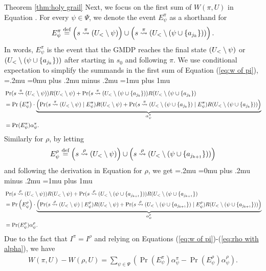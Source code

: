 \begin{proofof}{Theorem \ref{thm:holy grail}}
Next, we focus on the first sum of $W(\pi,U)$ in Equation . For every $\psi\in \Psi$, we denote the event $E^\pi_\psi$ as a shorthand for
\[
E^\pi_\psi \stackrel{\text{def}}{=} \left(s\stackrel{\pi}{\rightsquigarrow}(U_<\setminus \psi)\right)\cup\left( s\stackrel{\pi}{\rightsquigarrow}(U_<\setminus (\psi \cup \{a_{j_k}\}))\right).
\]
In words, $E^\pi_\psi$ is the event that the GMDP reaches the final state $(U_<\setminus \psi)$ or $(U_<\setminus (\psi \cup \{a_{j_k}\}))$ after starting in $s_0$ and following $\pi$. We use conditional expectation to simplify the summands in the first sum of Equation (\ref{eq:w of pi}),
{\thinmuskip=.2mu
\medmuskip=0mu plus .2mu minus .2mu
\thickmuskip=1mu plus 1mu
\begin{align}\label{eq:pi with alpha}
&\Pr(s\stackrel{\pi}{\rightsquigarrow}(U_<\setminus \psi))R(U_<\setminus \psi)+\Pr(s\stackrel{\pi}{\rightsquigarrow}(U_<\setminus (\psi \cup \{a_{j_k}\}))R(U_<\setminus (\psi \cup \{a_{j_k}\})\nonumber\\
&=\Pr\left(E^\pi_\psi\right)\cdot \underbrace{\left( \Pr(s\stackrel{\pi}{\rightsquigarrow}(U_<\setminus \psi)\mid E^\pi_\psi)R(U_<\setminus \psi)+\Pr(s\stackrel{\pi}{\rightsquigarrow}(U_<\setminus (\psi \cup \{a_{j_k}\})\mid E^\pi_\psi)R(U_<\setminus (\psi \cup \{a_{j_k}\}))\right)}_{\alpha^\pi_\psi}\nonumber\\
&=\Pr(E^\pi_\psi) \alpha^\pi_\psi. 
\end{align}}%
Similarly for $\rho$, by letting
\[
E^\rho_\psi \stackrel{\text{def}}{=} \left(s\stackrel{\rho}{\rightsquigarrow}(U_<\setminus \psi)\right)\cup\left( s\stackrel{\rho}{\rightsquigarrow}(U_<\setminus (\psi \cup \{a_{j_{k+1}}\}))\right)
\]
and following the derivation in Equation  for $\rho$, we get
{\thinmuskip=.2mu
\medmuskip=0mu plus .2mu minus .2mu
\thickmuskip=1mu plus 1mu
\begin{align}\label{eq:rho with alpha}
&\Pr(s\stackrel{\rho}{\rightsquigarrow}(U_<\setminus \psi))R(U_<\setminus \psi)+\Pr(s\stackrel{\rho}{\rightsquigarrow}(U_<\setminus (\psi \cup \{a_{j_{k+1}}\}))R(U_<\setminus (\psi \cup \{a_{j_{k+1}}\})\nonumber\\
&=\Pr\left(E^\rho_\psi\right)\cdot \underbrace{\left( \Pr(s\stackrel{\rho}{\rightsquigarrow}(U_<\setminus \psi)\mid E^\rho_\psi)R(U_<\setminus \psi)+\Pr(s\stackrel{\rho}{\rightsquigarrow}(U_<\setminus (\psi \cup \{a_{j_{k+1}}\})\mid E^\rho_\psi)R(U_<\setminus (\psi \cup \{a_{j_{k+1}}\})) \right)}_{\alpha^\rho_\psi}\nonumber\\
&=\Pr(E^\rho_\psi) \alpha^\rho_\psi. 
\end{align}}%
Due to the fact that $I^\pi=I^\rho$ and relying on Equations (\ref{eq:w of pi})-(\ref{eq:rho with alpha}), we have  
\begin{align}\label{eq:w minus w}
W(\pi,U)-W(\rho,U)=\sum_{\psi\in \Psi}\left(\Pr(E^\pi_\psi) \alpha^\pi_\psi-\Pr(E^\rho_\psi) \alpha^\rho_\psi\right).

\end{align}
\end{proofof}
